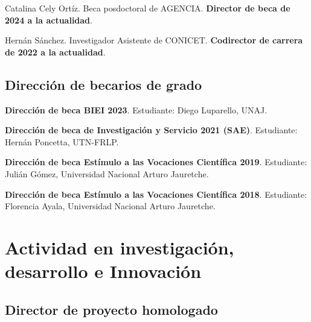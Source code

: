 \documentclass[margin,line]{res}
\begin{document}
\begin{resume}
Catalina Cely Ortíz. Beca posdoctoral de AGENCIA. \textbf{Director de beca de 2024 a la actualidad}.

Hernán Sánchez. Investigador Asistente de CONICET. \textbf{Codirector de carrera de 2022 a la actualidad}.
%
%
%

\subsection{ Dirección de becarios de grado}

{\bf Dirección de beca BIEI 2023}. Estudiante: Diego Luparello,  UNAJ.

{\bf Dirección de beca de Investigación y Servicio 2021 (SAE)}. Estudiante: Hernán Poncetta,  UTN-FRLP.

{\bf Dirección de beca Estímulo a las Vocaciones Científica 2019}. Estudiante: Julián Gómez, Universidad Nacional Arturo Jauretche.

{\bf Dirección de beca Estímulo a las Vocaciones Científica 2018}. Estudiante: Florencia Ayala, Universidad Nacional Arturo Jauretche.
%
%
%
%

\section{ Actividad en investigación, desarrollo e Innovación}
\vspace*{-.2in}

\subsection{ Director de proyecto homologado}


\end{resume}
\end{document}

